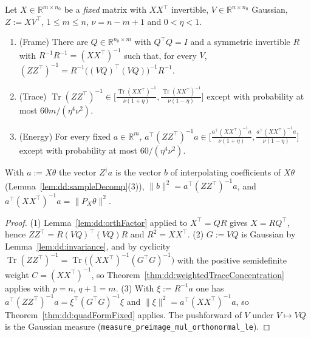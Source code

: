 \begin{theorem}\label{thm:dd:fixedDesignSample}
  \leanok
Let $X\in\mathbb R^{m\times n_0}$ be a \emph{fixed} matrix with $XX^\top$ invertible, $V\in\mathbb R^{n\times n_0}$ Gaussian, $Z:=XV^\top$, $1\le m\le n$, $\nu=n-m+1$ and $0<\eta<1$.
\begin{enumerate}
  \item (Frame) There are $Q\in\mathbb R^{n_0\times m}$ with $Q^\top Q=I$ and a symmetric invertible $R$ with $R^{-1}R^{-1}=(XX^\top)^{-1}$ such that, for every $V$, $(ZZ^\top)^{-1}=R^{-1}\bigl((VQ)^\top(VQ)\bigr)^{-1}R^{-1}$.
  \item (Trace) $\operatorname{Tr}(ZZ^\top)^{-1}\in\bigl[\tfrac{\operatorname{Tr}(XX^\top)^{-1}}{\nu(1+\eta)},\tfrac{\operatorname{Tr}(XX^\top)^{-1}}{\nu(1-\eta)}\bigr]$ except with probability at most $60m/(\eta^4\nu^2)$.
  \item (Energy) For every fixed $a\in\mathbb R^m$, $a^\top(ZZ^\top)^{-1}a\in\bigl[\tfrac{a^\top(XX^\top)^{-1}a}{\nu(1+\eta)},\tfrac{a^\top(XX^\top)^{-1}a}{\nu(1-\eta)}\bigr]$ except with probability at most $60/(\eta^4\nu^2)$.
\end{enumerate}
With $a:=X\theta$ the vector $Z^\dagger a$ is the vector $b$ of interpolating coefficients of $X\theta$ (Lemma~\ref{lem:dd:sampleDecomp}(3)), $\|b\|^2=a^\top(ZZ^\top)^{-1}a$, and $a^\top(XX^\top)^{-1}a=\|P_X\theta\|^2$.
\end{theorem}

\begin{proof}
  \leanok
(1) Lemma~\ref{lem:dd:orthFactor} applied to $X^\top=QR$ gives $X=RQ^\top$, hence $ZZ^\top=R(VQ)^\top(VQ)R$ and $R^2=XX^\top$. (2) $G:=VQ$ is Gaussian by Lemma~\ref{lem:dd:invariance}, and by cyclicity $\operatorname{Tr}(ZZ^\top)^{-1}=\operatorname{Tr}\bigl((XX^\top)^{-1}(G^\top G)^{-1}\bigr)$ with the positive semidefinite weight $C=(XX^\top)^{-1}$,
so Theorem~\ref{thm:dd:weightedTraceConcentration} applies with $p=n$, $q+1=m$. (3) With $\xi:=R^{-1}a$ one has $a^\top(ZZ^\top)^{-1}a=\xi^\top(G^\top G)^{-1}\xi$ and $\|\xi\|^2=a^\top(XX^\top)^{-1}a$, so Theorem~\ref{thm:dd:quadFormFixed} applies. The pushforward of $V$ under $V\mapsto VQ$ is the Gaussian measure (\texttt{measure\_preimage\_mul\_orthonormal\_le}).
\end{proof}

